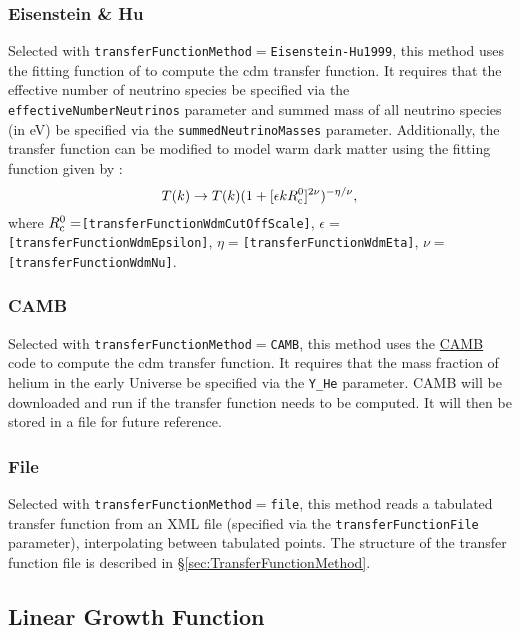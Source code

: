 \subsubsection{Eisenstein \& Hu}

Selected with {\tt transferFunctionMethod}$=${\tt Eisenstein-Hu1999}, this method uses the fitting function of \cite{eisenstein_power_1999} to compute the \gls{cdm} transfer function. It requires that the effective number of neutrino species be specified via the {\tt effectiveNumberNeutrinos} parameter and summed mass of all neutrino species (in eV) be specified via the {\tt summedNeutrinoMasses} parameter. Additionally, the transfer function can be modified to model warm dark matter using the fitting function given by \cite{barkana_constraints_2001}:
\begin{equation}
T(k) \rightarrow T(k) (1+[\epsilon k R_{\rm c}^0]^{2\nu})^{-\eta/\nu},
\end{equation}
where $R_{\rm c}^0=${\tt [transferFunctionWdmCutOffScale]}, $\epsilon=${\tt [transferFunctionWdmEpsilon]}, $\eta=${\tt [transferFunctionWdmEta]}, $\nu=${\tt [transferFunctionWdmNu]}.

\subsubsection{{\sc CAMB}}\label{sec:TransferFunction:CAMB}

Selected with {\tt transferFunctionMethod}$=${\tt CAMB}, this method uses the \href{http://camb.info/}{\sc CAMB} code to compute the \gls{cdm} transfer function. It requires that the mass fraction of helium in the early Universe be specified via the {\tt Y\_He} parameter. {\sc CAMB} will be downloaded and run if the transfer function needs to be computed. It will then be stored in a file for future reference.

\subsubsection{File}

Selected with {\tt transferFunctionMethod}$=${\tt file}, this method reads a tabulated transfer function from an XML file (specified via the {\tt transferFunctionFile} parameter), interpolating between tabulated points. The structure of the transfer function file is described in \S\ref{sec:TransferFunctionMethod}.

\subsection{Linear Growth Function}

